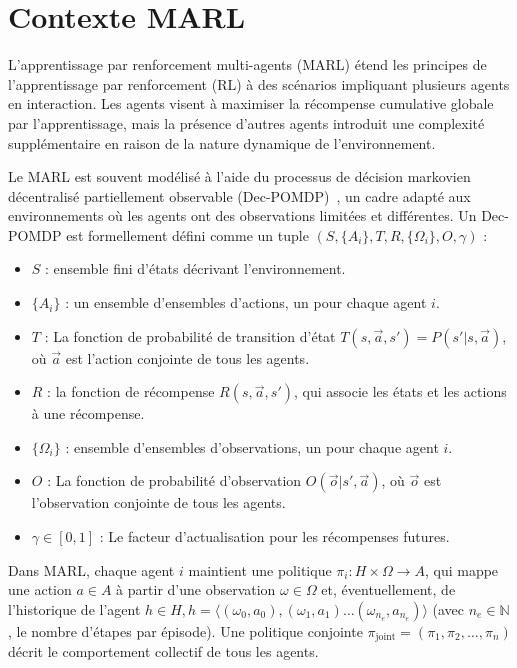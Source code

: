 \section{Contexte MARL}\label{sec:marl_background}

L'apprentissage par renforcement multi-agents (MARL) étend les principes de l'apprentissage par renforcement (RL) à des scénarios impliquant plusieurs agents en interaction. Les agents visent à maximiser la récompense cumulative globale par l'apprentissage, mais la présence d'autres agents introduit une complexité supplémentaire en raison de la nature dynamique de l'environnement.

Le MARL est souvent modélisé à l'aide du processus de décision markovien décentralisé partiellement observable (Dec-POMDP)~\cite{Beynier2013}, un cadre adapté aux environnements où les agents ont des observations limitées et différentes. Un Dec-POMDP est formellement défini comme un tuple $(S, \{A_i\}, T, R, \{\Omega_i\}, O, \gamma)$ :

\begin{itemize}
  \item $S$ : ensemble fini d'états décrivant l'environnement.
  \item $\{A_i\}$ : un ensemble d'ensembles d'actions, un pour chaque agent $i$.
  \item $T$ : La fonction de probabilité de transition d'état $T(s, \vec{a}, s') = P(s'|s, \vec{a})$, où $\vec{a}$ est l'action conjointe de tous les agents.
  \item $R$ : la fonction de récompense $R(s, \vec{a}, s')$, qui associe les états et les actions à une récompense.
  \item $\{\Omega_i\}$ : ensemble d'ensembles d'observations, un pour chaque agent $i$.
  \item $O$ : La fonction de probabilité d'observation $O(\vec{o} | s', \vec{a})$, où $\vec{o}$ est l'observation conjointe de tous les agents.
  \item $\gamma \in [0,1]$ : Le facteur d'actualisation pour les récompenses futures.
\end{itemize}

Dans MARL, chaque agent $i$ maintient une politique $\pi_i: H \times \Omega \rightarrow A$, qui mappe une action $a \in A$ à partir d'une observation $\omega \in \Omega$ et, éventuellement, de l'historique de l'agent $h \in H, h=\langle(\omega_0,a_0),(\omega_1,a_1)\dots(\omega_{n_e},a_{n_e})\rangle$ (avec $n_e \in \mathbb{N}$, le nombre d'étapes par épisode). Une politique conjointe $\pi_{\text{joint}} = (\pi_1, \pi_2, \ldots, \pi_n)$ décrit le comportement collectif de tous les agents.

